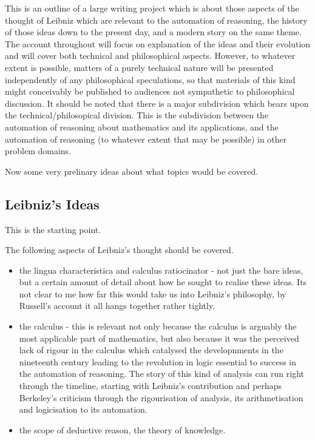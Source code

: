 \documentclass{rbjk}
\begin{document}
\begin{article}
This is an outline of a large writing project which is about those aspects of the thought of Leibniz which are relevant to the automation of reasoning, the history of those ideas down to the present day, and a modern story on the same theme.
The account throughout will focus on explanation of the ideas and their evolution and will cover both technical and philosophical aspects.
However, to whatever extent is possible, matters of a purely technical nature will be presented independently of any philosophical speculations, so that materials of this kind might conceivably be published to audiences not sympathetic to philosophical discussion.
It should be noted that there is a major subdivision which bears upon the technical/philosopical division.
This is the subdivision between the automation of reasoning about mathematics and its applications, and the automation of reasoning (to whatever extent that may be possible) in other problem domains. 

Now some very prelinary ideas about what topics would be covered.

\subsection{Leibniz's Ideas}

This is the starting point.

The following aspects of Leibniz's thought should be covered.
\begin{itemize}
\item the lingua characteristica and calculus ratiocinator - not just the bare ideas, but a certain amount of detail about how he sought to realise these ideas.
Its not clear to me how far this would take us into Leibniz's philosophy, by Russell's account it all hangs together rather tightly.
\item the calculus - this is relevant not only because the calculus is arguably the most applicable part of mathematics, but also because it was the perceived lack of rigour in the calculus which catalysed the developnments in the nineteenth century leading to the revolution in logic essential to success in the automation of reasoning.
The story of this kind of analysis can run right through the timeline, starting with Leibniz's contribution and perhaps Berkeley's criticism through the rigourisation of analysis, its arithmetisation and logicisation to its automation.
\item the scope of deductive reason, the theory of knowledge.
\end{itemize}


\end{article}
\end{document}
